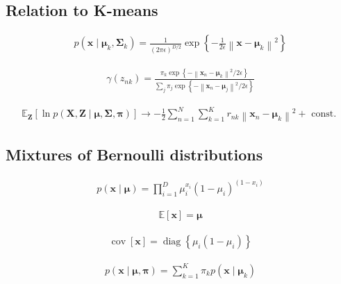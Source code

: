 \documentclass{article}
\begin{document}
\subsection{Relation to K-means}

\begin{align*}
p\left(\mathbf{x} \mid \boldsymbol{\mu}_{k}, \boldsymbol{\Sigma}_{k}\right)=\frac{1}{(2 \pi \epsilon)^{D / 2}} \exp \left\{-\frac{1}{2 \epsilon}\left\|\mathbf{x}-\boldsymbol{\mu}_{k}\right\|^{2}\right\} 
\tag{15.31}
\end{align*}

\begin{align*}
\gamma\left(z_{n k}\right)=\frac{\pi_{k} \exp \left\{-\left\|\mathbf{x}_{n}-\boldsymbol{\mu}_{k}\right\|^{2} / 2 \epsilon\right\}}{\sum_{j} \pi_{j} \exp \left\{-\left\|\mathbf{x}_{n}-\boldsymbol{\mu}_{j}\right\|^{2} / 2 \epsilon\right\}} 
\tag{15.32}
\end{align*}

\begin{align*}
\mathbb{E}_{\mathbf{Z}}[\ln p(\mathbf{X}, \mathbf{Z} \mid \boldsymbol{\mu}, \boldsymbol{\Sigma}, \boldsymbol{\pi})]\rightarrow-\frac{1}{2} \sum_{n=1}^{N} \sum_{k=1}^{K} r_{n k}\left\|\mathbf{x}_{n}-\boldsymbol{\mu}_{k}\right\|^{2}+\text{ const. } 
\tag{15.33}
\end{align*}

\subsection{Mixtures of Bernoulli distributions}

\begin{align*}
p(\mathbf{x} \mid \boldsymbol{\mu})=\prod_{i=1}^{D} \mu_{i}^{x_{i}}\left(1-\mu_{i}\right)^{\left(1-x_{i}\right)} 
\tag{15.34}
\end{align*}

\begin{align*}
\mathbb{E}[\mathbf{x}]=\boldsymbol{\mu} 
\tag{15.35}
\end{align*}

\begin{align*}
\operatorname{cov}[\mathbf{x}]=\operatorname{diag}\left\{\mu_{i}\left(1-\mu_{i}\right)\right\} 
\tag{15.36}
\end{align*}

\begin{align*}
p(\mathbf{x} \mid \boldsymbol{\mu}, \boldsymbol{\pi})=\sum_{k=1}^{K} \pi_{k} p\left(\mathbf{x} \mid \boldsymbol{\mu}_{k}\right) 
\tag{15.37}
\end{align*}
\end{document}
